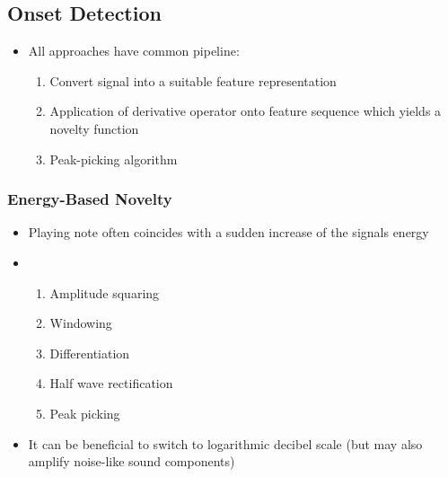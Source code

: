 \documentclass{scrartcl}
\begin{document}
\subsection*{Onset Detection}
\begin{itemize}
    \item
	All approaches have common pipeline:
	\begin{enumerate}
	    \item
		Convert signal into a suitable feature representation
	    \item
		Application of derivative operator onto feature sequence which yields a novelty function
	    \item
		Peak-picking algorithm
	\end{enumerate}
\end{itemize}
\subsubsection*{Energy-Based Novelty}
\begin{itemize}
    \item
	Playing note often coincides with a sudden increase of the signals energy
    \item
	\begin{enumerate}
	    \item
		Amplitude squaring
	    \item
		Windowing
	    \item
		Differentiation
	    \item
		Half wave rectification
	    \item
		Peak picking
	\end{enumerate}
    \item
	It can be beneficial to switch to logarithmic decibel scale (but may also amplify noise-like sound components)
\end{itemize}
\end{document}
